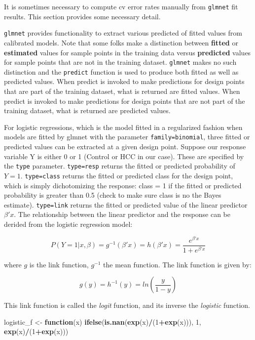 \documentclass[
]{book}
\newenvironment{Shaded}{\begin{snugshade}}{\end{snugshade}}
\newcommand{\ControlFlowTok}[1]{\textcolor[rgb]{0.13,0.29,0.53}{\textbf{#1}}}
\newcommand{\DecValTok}[1]{\textcolor[rgb]{0.00,0.00,0.81}{#1}}
\newcommand{\KeywordTok}[1]{\textcolor[rgb]{0.13,0.29,0.53}{\textbf{#1}}}
\newcommand{\NormalTok}[1]{#1}
\newcommand{\OperatorTok}[1]{\textcolor[rgb]{0.81,0.36,0.00}{\textbf{#1}}}
\newcommand{\StringTok}[1]{\textcolor[rgb]{0.31,0.60,0.02}{#1}}
\begin{document}
It is sometimes necessary to compute cv error rates manually from
\texttt{glmnet} fit results. This section provides some necessary detail.

\texttt{glmnet} provides functionality to extract various predicted of fitted values
from calibrated models. Note that some folks make a distinction between
\textbf{fitted} or \textbf{estimated} values for sample points in the training data
versus \textbf{predicted} values for sample points that
are not in the training dataset. \texttt{glmnet} makes no such distinction and the
\texttt{predict} function is used to produce both fitted as well as predicted values.
When predict is invoked to make predictions for design points that are part
of the training dataset, what is returned are fitted values.
When predict is invoked to make predictions for design points that are not part
of the training dataset, what is returned are predicted values.

For logistic regressions, which is the model fitted in a regularized fashion
when models are fitted by glmnet with the parameter \texttt{family=\textquotesingle{}binomial\textquotesingle{}}, three
fitted or predicted values can be extracted at a given design point.
Suppose our response variable Y is either 0 or 1 (Control or HCC in our case).
These are specified by the \texttt{type} parameter. \texttt{type=\textquotesingle{}resp\textquotesingle{}} returns
the fitted or predicted probability of \(Y=1\). \texttt{type=\textquotesingle{}class\textquotesingle{}} returns the fitted or
predicted class for the design point, which is simply dichotomizing the
response: class = 1 if the fitted or predicted probability is greater than 0.5
(check to make sure class is no the Bayes estimate). \texttt{type=\textquotesingle{}link\textquotesingle{}} returns
the fitted or predicted value of the linear predictor \(\beta'x\). The relationship
between the linear predictor and the response can be derided from the
logistic regression model:

\[P(Y=1|x,\beta) = g^{-1}(\beta'x) = h(\beta'x) = \frac{e^{\beta'x}}{1+e^{\beta'x}}\]

where \(g\) is the link function, \(g^{-1}\) the mean function.
The link function is given by:

\[g(y) = h^{-1}(y) = ln(\frac{y}{1-y})\]

This link function is called the \emph{logit} function, and its inverse the \emph{logistic}
function.

\begin{Shaded}
\begin{Highlighting}[]
\NormalTok{logistic\_f <{-}}\StringTok{ }\ControlFlowTok{function}\NormalTok{(x) }\KeywordTok{ifelse}\NormalTok{(}\KeywordTok{is.nan}\NormalTok{(}\KeywordTok{exp}\NormalTok{(x)}\OperatorTok{/}\NormalTok{(}\DecValTok{1}\OperatorTok{+}\KeywordTok{exp}\NormalTok{(x))), }\DecValTok{1}\NormalTok{, }\KeywordTok{exp}\NormalTok{(x)}\OperatorTok{/}\NormalTok{(}\DecValTok{1}\OperatorTok{+}\KeywordTok{exp}\NormalTok{(x)))}
\end{Highlighting}
\end{Shaded}
\end{document}

